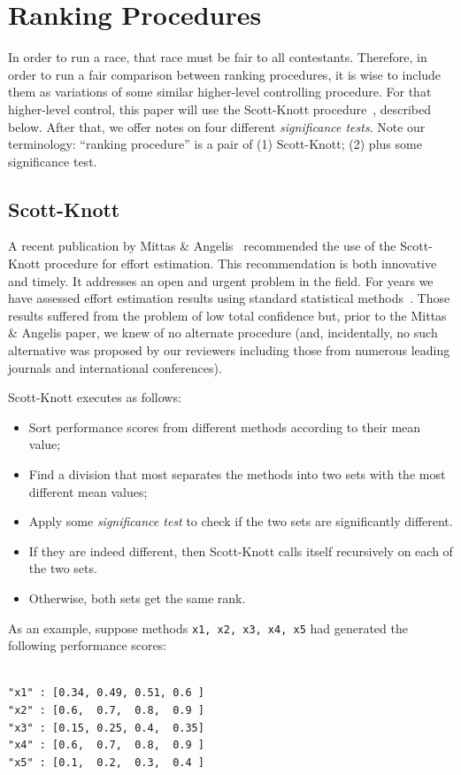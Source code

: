 \documentclass{sig-alternate}
\newcommand{\bi}{\begin{itemize}}
\newcommand{\ei}{\end{itemize}}
\begin{document}
\section{Ranking Procedures}
In order to run a race, that race must be fair to all contestants.
Therefore, in order to run a fair comparison between ranking
procedures, it is wise to include them as variations of some
similar higher-level controlling procedure. 
For that higher-level control, this paper will use
the Scott-Knott procedure~\cite{scott74}, 
described below. After that, we
offer notes on four different {\em significance tests}. 
Note our terminology:
``ranking procedure'' is a pair of
(1) Scott-Knott; (2) plus some significance test.



\subsection{Scott-Knott}
A recent publication by Mittas \& Angelis~\cite{mittas12a}
recommended the use of
the Scott-Knott procedure for effort
estimation.
This  recommendation
is both innovative
and timely. It
 addresses  an open and urgent 
problem in the field. For years we have
assessed effort estimation results using standard statistical 
methods~\cite{me06f,me11a,keung12}.
Those results suffered from the problem of low total confidence 
but, prior to the Mittas \& Angelis paper,
we knew 
of no alternate procedure (and, incidentally, no such alternative was proposed
by our reviewers including those from numerous
leading journals and international conferences).


Scott-Knott executes as follows:
\bi
\item Sort performance scores from different methods according to
their mean value;
\item Find a division that most separates the methods into two sets with the most different mean values;
\item Apply some {\em significance test} to check if the two sets are significantly different.
\item If they are indeed different, then
 Scott-Knott calls itself recursively
on each of the two sets. 
\item Otherwise, both sets get the same rank.
\ei
As an example, suppose methods {\tt x1, x2, x3, x4, x5}
had generated the following performance scores:

\begin{minipage}{0.7\linewidth}
\scriptsize
\begin{verbatim}

"x1" : [0.34, 0.49, 0.51, 0.6 ]
"x2" : [0.6,  0.7,  0.8,  0.9 ]
"x3" : [0.15, 0.25, 0.4,  0.35]
"x4" : [0.6,  0.7,  0.8,  0.9 ]
"x5" : [0.1,  0.2,  0.3,  0.4 ]

\end{verbatim}
\end{minipage}
\end{document}
